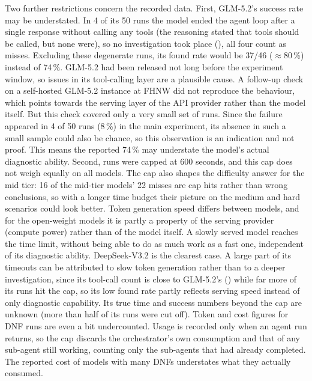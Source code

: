 Two further restrictions concern the recorded data. First, GLM-5.2's success rate may be
understated. In 4 of its 50 runs the model ended the agent loop after a single response
without calling any tools (the reasoning stated that tools should be called, but none were), so no investigation took place (),
all four count as misses. Excluding these degenerate runs, its found rate would be 37/46
($\approx$80\,\%) instead of 74\,\%. GLM-5.2 had been released not long before the
experiment window, so issues in its tool-calling layer are a plausible cause. A follow-up
check on a self-hosted GLM-5.2 instance at FHNW did not reproduce the behaviour, which
points towards the serving layer of the API provider rather than the model itself. But this
check covered only a very small set of runs. Since the failure appeared in 4 of 50 runs
(8\,\%) in the main experiment, its absence in such a small sample could also be
chance, so this observation is an indication and not proof. This means the reported 74\,\% may understate the model's actual diagnostic ability.
Second, runs were capped at 600 seconds, and this cap does not weigh equally on all models.
The cap also shapes the difficulty answer for the mid tier: 16 of the mid-tier models' 22
misses are cap hits rather than wrong conclusions, so with a longer time budget their picture
on the medium and hard scenarios could look better.
Token generation speed differs between models, and for the open-weight models it
is partly a property of the serving provider (compute power) rather than of the model itself. A slowly served
model reaches the time limit, without being able to do as much work as a fast one, independent
of its diagnostic ability. DeepSeek-V3.2 is the clearest case. A large part of its timeouts can be attributed to slow
token generation rather than to a deeper investigation, since its tool-call count is close to
GLM-5.2's () while far more of its runs hit the cap, so its low
found rate partly reflects serving speed instead of only diagnostic capability. Its true time
and success numbers beyond the cap are unknown (more than half of its runs were cut off). Token and cost figures for DNF
runs are even a bit undercounted. Usage is recorded only when an agent run returns, so the cap
discards the orchestrator's own consumption and that of any sub-agent still working,
counting only the sub-agents that had already completed. The reported cost of models with many
DNFs understates what they actually consumed.
